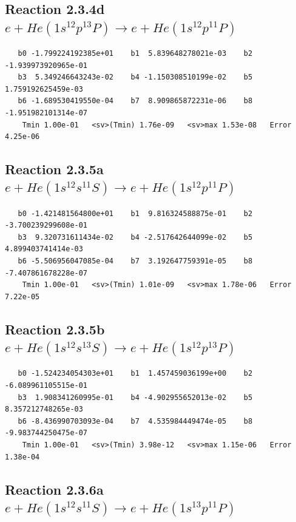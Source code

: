 \documentclass[12pt,dvipdfmx]{article}
\begin{document}
\newpage
\subsection{
Reaction 2.3.4d $  e + He(1s^12p^13P) \rightarrow e + He(1s^12p^11P)$}


\begin{small}\begin{verbatim}
   b0 -1.799224192385e+01    b1  5.839648278021e-03    b2 -1.939973920965e-01
   b3  5.349246643243e-02    b4 -1.150308510199e-02    b5  1.759192625459e-03
   b6 -1.689530419550e-04    b7  8.909865872231e-06    b8 -1.951982101314e-07
    Tmin 1.00e-01   <sv>(Tmin) 1.76e-09   <sv>max 1.53e-08   Error 4.25e-06
\end{verbatim}\end{small}

\newpage
\subsection{
Reaction 2.3.5a $  e + He(1s^12s^11S) \rightarrow e + He(1s^12p^11P)$}


\begin{small}\begin{verbatim}
   b0 -1.421481564800e+01    b1  9.816324588875e-01    b2 -3.700239299608e-01
   b3  9.320731611434e-02    b4 -2.517642644099e-02    b5  4.899403741414e-03
   b6 -5.506956047085e-04    b7  3.192647759391e-05    b8 -7.407861678228e-07
    Tmin 1.00e-01   <sv>(Tmin) 1.01e-09   <sv>max 1.78e-06   Error 7.22e-05
\end{verbatim}\end{small}

\newpage
\subsection{
Reaction 2.3.5b $  e + He(1s^12s^13S) \rightarrow e + He(1s^12p^13P)$}


\begin{small}\begin{verbatim}
   b0 -1.524234054303e+01    b1  1.457459036199e+00    b2 -6.089961105515e-01
   b3  1.908341260995e-01    b4 -4.902955652013e-02    b5  8.357212748265e-03
   b6 -8.436990703093e-04    b7  4.535984449474e-05    b8 -9.983744250475e-07
    Tmin 1.00e-01   <sv>(Tmin) 3.98e-12   <sv>max 1.15e-06   Error 1.38e-04
\end{verbatim}\end{small}

\newpage
\subsection{
Reaction 2.3.6a $  e + He(1s^12s^11S) \rightarrow e + He(1s^13p^11P)$}
\end{document}
